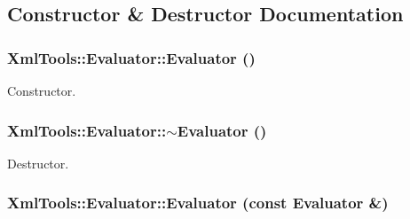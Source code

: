 \subsection{Constructor \& Destructor Documentation}
\hypertarget{class_xml_tools_1_1_evaluator_adcce935da40868c8e9ee41a6cd7da30c}{
\subsubsection[{Evaluator}]{\setlength{\rightskip}{0pt plus 5cm}XmlTools::Evaluator::Evaluator ()}}
\label{class_xml_tools_1_1_evaluator_adcce935da40868c8e9ee41a6cd7da30c}
Constructor. \hypertarget{class_xml_tools_1_1_evaluator_acf06d5359f233c9e5c5d9127eb065f25}{
\subsubsection[{$\sim$Evaluator}]{\setlength{\rightskip}{0pt plus 5cm}XmlTools::Evaluator::$\sim$Evaluator ()}}
\label{class_xml_tools_1_1_evaluator_acf06d5359f233c9e5c5d9127eb065f25}
Destructor. \hypertarget{class_xml_tools_1_1_evaluator_a3b212d7fe6e68a9f398daebc2968ebfe}{
\subsubsection[{Evaluator}]{\setlength{\rightskip}{0pt plus 5cm}XmlTools::Evaluator::Evaluator (const {\bf Evaluator} \&)}}
\label{class_xml_tools_1_1_evaluator_a3b212d7fe6e68a9f398daebc2968ebfe}


